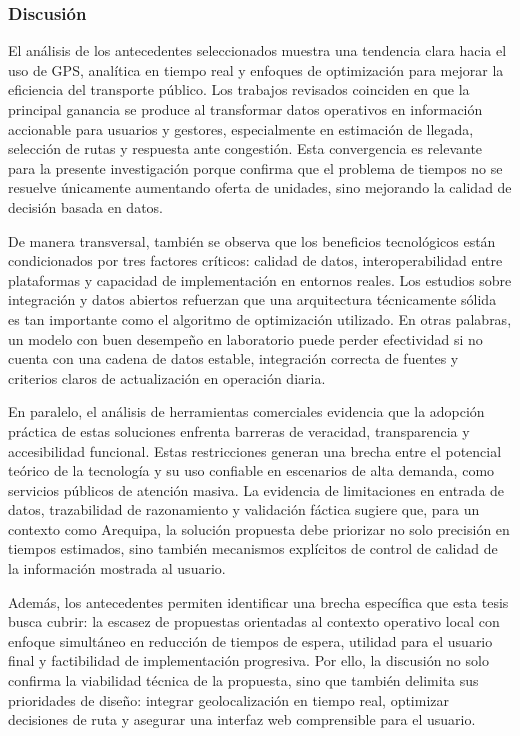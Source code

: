 \subsubsection{Discusión}

El análisis de los antecedentes seleccionados muestra una tendencia clara hacia el uso de GPS, analítica en tiempo real y enfoques de optimización para mejorar la eficiencia del transporte público. Los trabajos revisados coinciden en que la principal ganancia se produce al transformar datos operativos en información accionable para usuarios y gestores, especialmente en estimación de llegada, selección de rutas y respuesta ante congestión. Esta convergencia es relevante para la presente investigación porque confirma que el problema de tiempos no se resuelve únicamente aumentando oferta de unidades, sino mejorando la calidad de decisión basada en datos.

De manera transversal, también se observa que los beneficios tecnológicos están condicionados por tres factores críticos: calidad de datos, interoperabilidad entre plataformas y capacidad de implementación en entornos reales. Los estudios sobre integración y datos abiertos refuerzan que una arquitectura técnicamente sólida es tan importante como el algoritmo de optimización utilizado. En otras palabras, un modelo con buen desempeño en laboratorio puede perder efectividad si no cuenta con una cadena de datos estable, integración correcta de fuentes y criterios claros de actualización en operación diaria.

En paralelo, el análisis de herramientas comerciales evidencia que la adopción práctica de estas soluciones enfrenta barreras de veracidad, transparencia y accesibilidad funcional. Estas restricciones generan una brecha entre el potencial teórico de la tecnología y su uso confiable en escenarios de alta demanda, como servicios públicos de atención masiva. La evidencia de limitaciones en entrada de datos, trazabilidad de razonamiento y validación fáctica sugiere que, para un contexto como Arequipa, la solución propuesta debe priorizar no solo precisión en tiempos estimados, sino también mecanismos explícitos de control de calidad de la información mostrada al usuario.

Además, los antecedentes permiten identificar una brecha específica que esta tesis busca cubrir: la escasez de propuestas orientadas al contexto operativo local con enfoque simultáneo en reducción de tiempos de espera, utilidad para el usuario final y factibilidad de implementación progresiva. Por ello, la discusión no solo confirma la viabilidad técnica de la propuesta, sino que también delimita sus prioridades de diseño: integrar geolocalización en tiempo real, optimizar decisiones de ruta y asegurar una interfaz web comprensible para el usuario.

